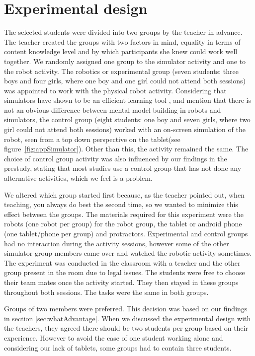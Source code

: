 \chapter{Experimental design}
The selected students were divided into two groups by the teacher in advance. 
The teacher created the groups with two factors in mind, equality in terms of content knowledge level and by which participants she knew could work well together.
We randomly assigned one group to the simulator activity and one to the robot activity. The robotics or experimental group (seven students: three boys and four girls, where one boy and one girl could not attend both sessions) was appointed to work with the physical robot activity. Considering that simulators have shown to be an efficient learning tool \cite{mitnik2009collaborative}, and  mention that there is not an obvious difference between mental model building in robots and simulators, the control group (eight students: one boy and seven girls, where two girl could not attend both sessions) worked with an on-screen simulation of the robot, seen from a top down perspective on the tablet(see figure~\ref{fig:appSimulator}). Other than this, the activity remained the same. 
The choice of control group activity was also influenced by our findings in the prestudy, stating that most studies use a control group that has not done any alternative activities, which we feel is a problem. 

\bigskip\noindent
We altered which group started first because, as the teacher pointed out, when teaching, you always do best the second time, so we wanted to minimize this effect between the groups. The materials required for this experiment were the robots (one robot per group) for the robot group, the tablet or android phone (one tablet/phone per group) and protractors. Experimental and control groups had no interaction during the activity sessions, however some of the other simulator group members came over and watched the robotic activity sometimes. 
The experiment was conducted in the classroom with a teacher and the other group present in the room due to legal issues. 
The students were free to choose their team mates once the activity started. They then stayed in these groups throughout both sessions. The tasks were the same in both groups.

\bigskip\noindent
Groups of two members were preferred. This decision was based on our findings in section \ref{sec:whatAdvantage}. When we discussed the experimental design with the teachers, they agreed there should be two students per group based on their experience. However to avoid the case of one student working alone and considering our lack of tablets, some groups had to contain three students.
